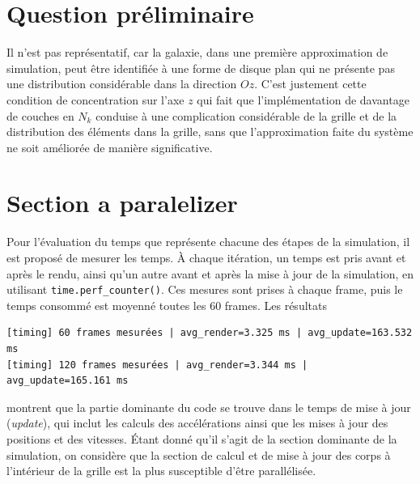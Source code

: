 \section{Question préliminaire}
Il n'est pas représentatif, car la galaxie, dans une première approximation de simulation, peut être identifiée à une forme de disque plan qui ne présente pas une distribution considérable dans la direction \(Oz\). C'est justement cette condition de concentration sur l'axe \(z\) qui fait que l'implémentation de davantage de couches en \(N_k\) conduise à une complication considérable de la grille et de la distribution des éléments dans la grille, sans que l'approximation faite du système ne soit améliorée de manière significative.


\section{Section a paralelizer}
Pour l’évaluation du temps que représente chacune des étapes de la simulation, il est proposé de mesurer les temps. À chaque itération, un temps est pris avant et après le rendu, ainsi qu’un autre avant et après la mise à jour de la simulation, en utilisant \texttt{time.perf\_counter()}. Ces mesures sont prises à chaque frame, puis le temps consommé est moyenné toutes les 60 frames. Les résultats

\begin{verbatim}
[timing] 60 frames mesurées | avg_render=3.325 ms | avg_update=163.532 ms
[timing] 120 frames mesurées | avg_render=3.344 ms | avg_update=165.161 ms
\end{verbatim}

montrent que la partie dominante du code se trouve dans le temps de mise à jour (\textit{update}), qui inclut les calculs des accélérations ainsi que les mises à jour des positions et des vitesses. Étant donné qu’il s’agit de la section dominante de la simulation, on considère que la section de calcul et de mise à jour des corps à l’intérieur de la grille est la plus susceptible d’être parallélisée.